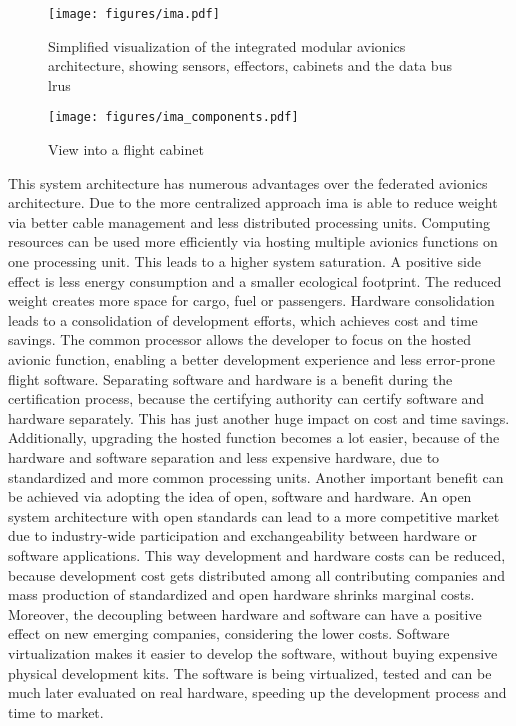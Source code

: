 \documentclass[titlepage]{report}
\begin{document}
\begin{figure}
    \centering
    \texttt{[image: figures/ima.pdf]}
    \caption{Simplified visualization of the integrated modular avionics architecture, showing sensors, effectors, cabinets and the data bus \glspl{lru}}\label{fig:ima}
\end{figure}

\begin{figure}
    \centering
    \texttt{[image: figures/ima\_components.pdf]}
    \caption{View into a flight cabinet}\label{fig:ima_components}
\end{figure}

This system architecture has numerous advantages over the federated avionics architecture. Due to the more centralized approach \gls{ima}
is able to reduce weight via better cable management and less distributed processing units. Computing resources can be used more efficiently
via hosting multiple avionics functions on one processing unit. This leads to a higher system saturation. A positive side effect is less
energy consumption and a smaller ecological footprint. The reduced weight creates more space for cargo, fuel or passengers. 
Hardware consolidation leads to a consolidation of development efforts, which achieves cost and time savings\cite{watkins2007transitioning}.
The common processor allows the developer to focus on the hosted avionic function, enabling a better development experience and less error-prone
flight software. Separating software and hardware is a benefit during the certification process, because the certifying authority can certify
software and hardware separately. This has just another huge impact on cost and time savings. Additionally, upgrading the hosted function
becomes a lot easier, because of the hardware and software separation and less expensive hardware, due to standardized and more common
processing units. Another important benefit can be achieved via adopting the idea of open, software and hardware. An open system architecture
with open standards can lead to a more competitive market due to industry-wide participation and exchangeability between hardware or
software applications. This way development and hardware costs can be reduced, because development cost gets distributed among all contributing
companies and mass production of standardized and open hardware shrinks marginal costs\cite{black2006open}. Moreover, the decoupling between hardware and software
can have a positive effect on new emerging companies, considering the lower costs\cite{watkins2007transitioning}. Software virtualization makes it easier to develop the
software, without buying expensive physical development kits. The software is being virtualized, tested and can be much later evaluated on real hardware, speeding up
the development process and time to market.
\end{document}
